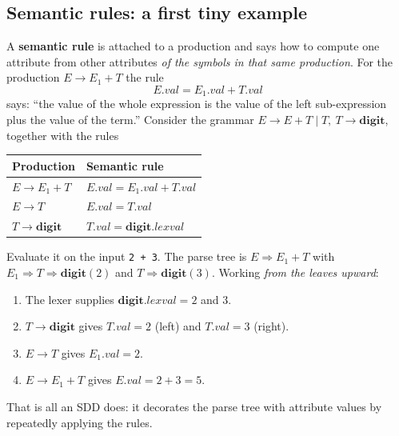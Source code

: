 \documentclass[11pt,a4paper]{article}
\newcommand{\at}[2]{\ensuremath{#1.\mathit{#2}}}
\begin{document}
\subsection{Semantic rules: a first tiny example}
A \textbf{semantic rule} is attached to a production and says how to compute one attribute from other attributes \emph{of the symbols in that same production}. For the production $E \to E_1 + T$ the rule
\[
\at{E}{val} = \at{E_1}{val} + \at{T}{val}
\]
says: ``the value of the whole expression is the value of the left sub-expression plus the value of the term.'' Consider the grammar $E \to E + T \mid T,\ T \to \mathbf{digit}$, together with the rules
\begin{center}
\small
\begin{tabular}{@{}l l@{}}
\toprule
\textbf{Production} & \textbf{Semantic rule} \\ \midrule
$E \to E_1 + T$ & $\at{E}{val} = \at{E_1}{val} + \at{T}{val}$ \\
$E \to T$ & $\at{E}{val} = \at{T}{val}$ \\
$T \to \mathbf{digit}$ & $\at{T}{val} = \at{\mathbf{digit}}{lexval}$ \\ \bottomrule
\end{tabular}
\end{center}
Evaluate it on the input \texttt{2 + 3}. The parse tree is $E \Rightarrow E_1 + T$ with $E_1 \Rightarrow T \Rightarrow \mathbf{digit}(2)$ and $T \Rightarrow \mathbf{digit}(3)$. Working \emph{from the leaves upward}:
\begin{enumerate}[nosep]
\item The lexer supplies $\at{\mathbf{digit}}{lexval}=2$ and $3$.
\item $T \to \mathbf{digit}$ gives $\at{T}{val}=2$ (left) and $\at{T}{val}=3$ (right).
\item $E \to T$ gives $\at{E_1}{val}=2$.
\item $E \to E_1 + T$ gives $\at{E}{val}=2+3=5$.
\end{enumerate}
That is all an SDD does: it decorates the parse tree with attribute values by repeatedly applying the rules.
\end{document}
